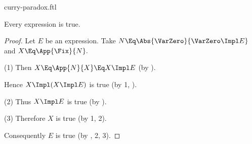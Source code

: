 \documentclass{stex}
\begin{document}
\begin{smodule}{curry-paradox.ftl}
\begin{forthel}
  \begin{theorem*}[title=Curry's Paradox,name=Curry Paradox]
    Every expression is true.
  \end{theorem*}
  \begin{proof}
    Let $E$ be an expression.
    Take $N \Eq \Abs{\VarZero}{\VarZero \Impl E}$ and $X \Eq \App{\Fix}{N}.$

    (1) Then $X \Eq \App{N}{X} \Eq X \Impl E$ (by ).

    Hence $X \Impl (X \Impl E)$ is true (by 1, ).

    (2) Thus $X \Impl E$ is true (by ).

    (3) Therefore $X$ is true (by 1, 2).

    Consequently $E$ is true (by , 2, 3).
  \end{proof}
\end{forthel}

\printbibliography
{}

\end{smodule}
\end{document}
